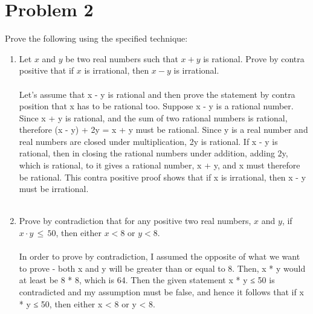 \documentclass{amsart}
\theoremstyle{definition}
\theoremstyle{Exercise}
\theoremstyle{remark}
\theoremstyle{rule}
\numberwithin{equation}{section}
\begin{document}
  \section*{Problem 2}
  Prove the following using the specified technique:
  \begin{enumerate}[label=(\alph*)]
    \item Let $x$ and $y$ be two real numbers such that $x + y$ is rational. Prove by contra positive that if $x$ is irrational, then $x - y$ is irrational.
          \\\\
Let's assume that x - y is rational and then prove the statement by contra position that x has to be rational too. Suppose x - y is a rational number. Since x + y is rational, and the sum of two rational numbers is rational, therefore (x - y) + 2y = x + y must be rational. Since y is a real number and real numbers are closed under multiplication, 2y is rational. If x - y is rational, then in closing the rational numbers under addition, adding 2y, which is rational, to it gives a rational number, x + y, and x must therefore be rational. This contra positive proof shows that if x is irrational, then x - y must be irrational.
\\\\
    \item Prove by contradiction that for any positive two real numbers, $x$ and $y$,
         if $x\cdot y\, \leq \,50$, then either $x < 8$ or $y < 8$.
          \\\\
In order to prove by contradiction, I assumed the opposite of what we want to prove - both x and y will be greater than or equal to 8. Then, x * y would at least be 8 * 8, which is 64. Then the given statement x * y ≤ 50 is contradicted and my assumption must be false, and hence it follows that if x * y ≤ 50, then either x < 8 or y < 8.
\\\\
  \end{enumerate}
  \newpage
  \section*{}
  \section*{}
\end{document}
